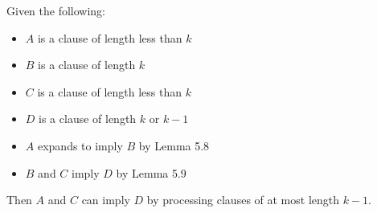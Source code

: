 \documentclass[manuscript]{acmart}
\begin{document}
    \begin{lemma}
        Given the following:
        \begin{itemize}
            \item $A$ is a clause of length less than $k$
            \item $B$ is a clause of length $k$
            \item $C$ is a clause of length less than $k$
            \item $D$ is a clause of length $k$ or $k - 1$
            \item $A$ expands to imply $B$ by Lemma 5.8
            \item $B$ and $C$ imply $D$ by Lemma 5.9
        \end{itemize}
        Then $A$ and $C$ can imply $D$ by processing clauses of at 
        most length $k - 1$.
    \end{lemma}
\end{document}
